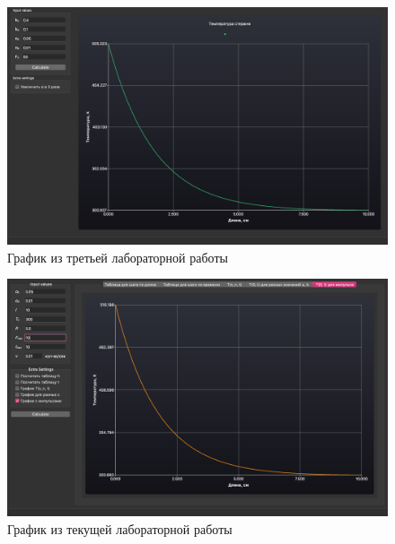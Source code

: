 \begin{enumerate}
        \begin{figure}[H]
            \centering
            \includegraphics[scale=0.35]{img/lab_03.png}
            \caption{График из третьей лабораторной работы}
            \label{img:lab_03}
        \end{figure}

        \begin{figure}[H]
            \centering
            \includegraphics[scale=0.35]{img/lab_03_new.png}
            \caption{График из текущей лабораторной работы}
            \label{img:lab_03_new}
        \end{figure}
\end{enumerate}
